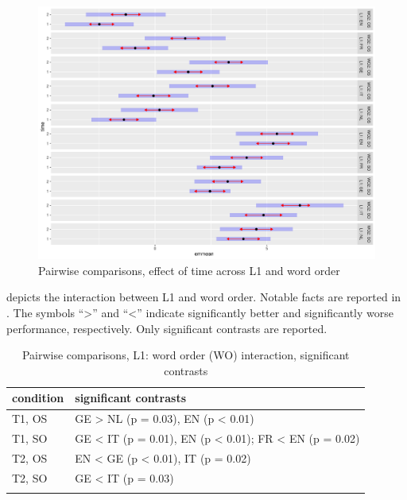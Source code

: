 \begin{figure}
    \includegraphics[width=\textwidth]{figures/05-3.pdf}
    \caption{Pairwise comparisons, effect of time across L1 and word order}
    \label{fig:05:3}
\end{figure}

 depicts the interaction between L1 and word order. Notable facts are reported in . The symbols “>” and “<” indicate significantly better and significantly worse performance, respectively. Only significant contrasts are reported.

\begin{table}
    \begin{tabularx}{\textwidth}{ll}
    \lsptoprule
    condition & significant contrasts\\
    \midrule
    T1, OS & GE > NL (p = 0.03), EN (p < 0.01)\\
    \tablevspace
    T1, SO & GE < IT (p = 0.01), EN (p < 0.01);\newline
    FR < EN (p = 0.02)\\
    \tablevspace
    T2, OS & EN < GE (p < 0.01), IT (p = 0.02)\\
    \tablevspace
    T2, SO & GE < IT (p = 0.03)\\
    \lspbottomrule
    \end{tabularx}
    \caption{Pairwise comparisons, L1: word order (WO) interaction, significant contrasts}
    \label{tab:05:5}
\end{table}

